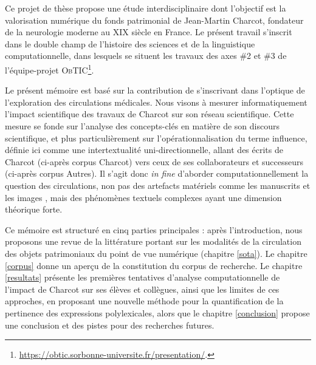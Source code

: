Ce projet de thèse propose une étude interdisciplinaire dont l'objectif est la valorisation numérique du fonds patrimonial de Jean-Martin Charcot, fondateur de la neurologie moderne au XIX\ieme{} siècle en France. 
Le présent travail s'inscrit dans le double champ de l'histoire des sciences et de la linguistique computationnelle, dans lesquels se situent les travaux des axes \#2 et \#3 de l'équipe-projet \textsc{ObTIC}\footnote{\url{https://obtic.sorbonne-universite.fr/presentation/}.}.

Le présent mémoire est basé sur la contribution de \citet{petkovic2023circulation} s'inscrivant dans l'optique de l'exploration des circulations médicales. Nous visons à mesurer informatiquement l'impact scientifique des travaux de Charcot sur son réseau scientifique. Cette mesure se fonde sur l'analyse des concepts-clés en matière de son discours scientifique, et plus particulièrement sur l'opérationnalisation du terme \og{}influence\fg{}, définie ici comme une intertextualité uni-directionnelle, allant des écrits de Charcot (ci-après corpus \og{}Charcot\fg{}) vers ceux de ses collaborateurs et successeurs (ci-après corpus \og{}Autres\fg{}). Il s'agit donc \textit{in fine} d'aborder computationnellement la question des circulations, non pas des artefacts matériels comme les manuscrits \citep{gabay2021katabase} et les images \citep{joyeux2019visual}, mais des phénomènes textuels complexes \citep{manjavacas} ayant une dimension théorique forte.

Ce mémoire est structuré en cinq parties principales : après l'introduction, nous proposons une revue de la littérature portant sur les modalités de la circulation des objets patrimoniaux du point de vue numérique (chapitre \ref{sota}). Le chapitre \ref{corpus} donne un aperçu de la constitution du corpus de recherche. Le chapitre \ref{resultats} présente les premières tentatives d'analyse computationnelle de l'impact de Charcot sur ses élèves et collègues, ainsi que les limites de ces approches, en proposant une nouvelle méthode pour la quantification de la pertinence des expressions polylexicales, alors que le chapitre \ref{conclusion} propose une conclusion et des pistes pour des recherches futures.










